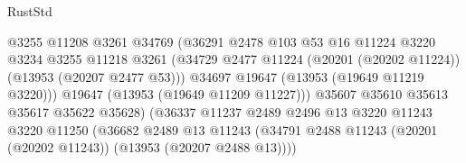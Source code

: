 \begin{lexlean}{RustStd}
\begin{coremodule}
                                            @3255
                                            @11208
                                            @3261
                                            @34769
                                            (@36291
                                              @2478
                                              @103
                                              @53
                                              @16
                                              @11224
                                              @3220
                                              @3234
                                              @3255
                                              @11218
                                              @3261
                                              (@34729
                                                @2477
                                                @11224
                                                (@20201 (@20202 @11224))
                                                (@13953 (@20207 @2477 @53)))
                                              @34697
                                              @19647
                                              (@13953 (@19649 @11219 @3220)))
                                            @19647
                                            (@13953 (@19649 @11209 @11227)))
                                          @35607
                                          @35610
                                          @35613
                                          @35617
                                          @35622
                                          @35628)
                                        (@36337
                                          @11237
                                          @2489
                                          @2496
                                          @13
                                          @3220
                                          @11243
                                          @3220
                                          @11250
                                          (@36682
                                            @2489
                                            @13
                                            @11243
                                            (@34791
                                              @2488
                                              @11243
                                              (@20201 (@20202 @11243))
                                              (@13953 (@20207 @2488 @13))))

\end{coremodule}
\end{lexlean}
